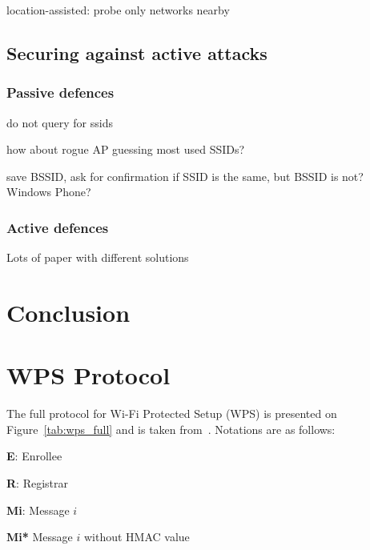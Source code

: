 \documentclass[12pt,a4paper,oneside,pdftex]{report}
\begin{document}
location-assisted: probe only networks nearby~\cite{kimposter}

\section{Securing against active attacks}

\subsection{Passive defences}
do not query for ssids

how about rogue AP guessing most used SSIDs?

save BSSID, ask for confirmation if SSID is the same, but BSSID is not? Windows Phone? 

\subsection{Active defences}

Lots of paper with different solutions




\chapter{Conclusion}
\label{chapter:conclusion}


% 



\appendix
\chapter{WPS Protocol}
\label{chapter:appendix:wps}

The full protocol for Wi-Fi Protected Setup (WPS) is presented on Figure~\ref{tab:wps_full} and is taken from~\cite{microsoftWCN}. Notations are as follows:

\textbf{E}: Enrollee

\textbf{R}: Registrar

\textbf{Mi}: Message $i$

\textbf{Mi*} Message $i$ without HMAC value
\end{document}
